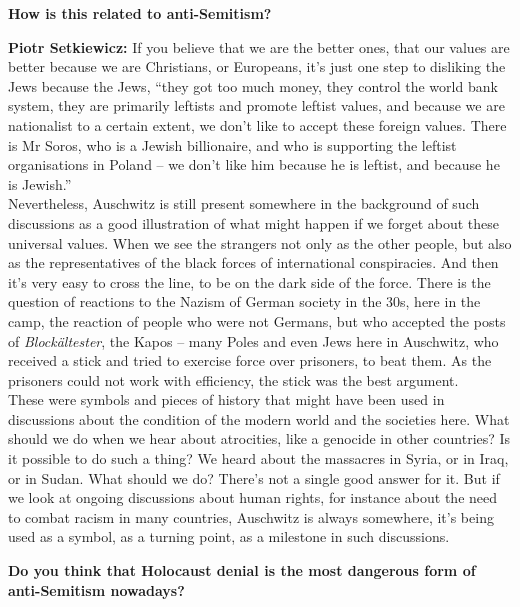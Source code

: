 \textbf{How is this related to anti-Semitism?} 

\textbf{Piotr Setkiewicz:} If you believe that we are the better ones, that our values are better because we are Christians, or Europeans, it’s just one step to disliking the Jews because the Jews, ``they got too much money, they control the world bank system, they are primarily leftists and promote leftist values, and because we are nationalist to a certain extent, we don’t like to accept these foreign values. There is Mr Soros, who is a Jewish billionaire, and who is supporting the leftist organisations in Poland – we don’t like him because he is leftist, and because he is Jewish.''\\
Nevertheless, Auschwitz is still present somewhere in the background of such discussions as a good illustration of what might happen if we forget about these universal values. When we see the strangers not only as the other people, but also as the representatives of the black forces of international conspiracies. And then it’s very easy to cross the line, to be on the dark side of the force. There is the question of reactions to the Nazism of German society in the 30s, here in the camp, the reaction of people who were not Germans, but who accepted the posts of \textit{Blockältester}, the Kapos – many Poles and even Jews here in Auschwitz, who received a stick and tried to exercise force over prisoners, to beat them. As the prisoners could not work with efficiency, the stick was the best argument.\\ 
These were symbols and pieces of history that might have been used in  discussions about the condition of the modern world and the societies here. What should we do when we hear about atrocities, like a genocide in other countries? Is it possible to do such a thing? We heard about the massacres in Syria, or in Iraq, or in Sudan. What should we do? There’s not a single good answer for it. But if we look at ongoing discussions about human rights, for instance about the need to combat racism in many countries, Auschwitz is always somewhere, it's being used as a symbol, as a turning point, as a milestone in such discussions.
 
\textbf{Do you think that Holocaust denial is the most dangerous form of anti-Semitism nowadays?}

